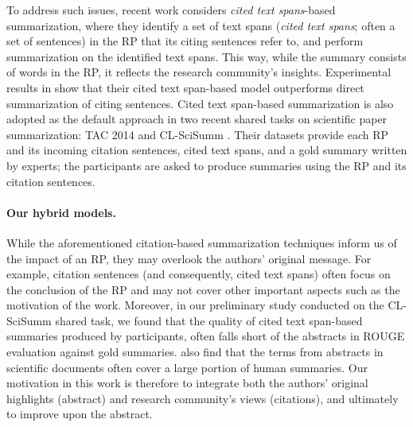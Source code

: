 \documentclass[letterpaper]{article} \usepackage{aaai19}  \usepackage{times}  \usepackage{helvet}  \usepackage{courier}  \usepackage{url}
\begin{document}
To address such issues, recent work
\cite{mei-zhai:2008:ACLMain,cohan2015sci,jaidka2016overview,li2017computational,Cohan:2017:CCS:3077136.3080740,cohan2017scientific}
considers {\it cited text spans}-based summarization, where
they identify a {set} of text spans ({\it cited text spans}; often a set of sentences) in the RP that
its citing sentences refer to, and
perform summarization on
the identified text spans.
This way, while the summary consists of words in the RP, it reflects the research community's insights.
Experimental results in \citeauthor{mei-zhai:2008:ACLMain} show that their cited text span-based model outperforms direct summarization of citing sentences.
Cited text span-based summarization is also adopted as the default approach in
two recent shared tasks on scientific paper summarization: TAC 2014
and CL-SciSumm
\cite{jaidka2016overview}.
Their datasets provide each RP and its incoming citation sentences, cited text spans, and a gold summary written by experts; the participants are asked to produce summaries using the RP and its citation sentences.



\paragraph{Our hybrid models.}

While the aforementioned citation-based summarization techniques inform us of the impact of an RP, they may overlook the authors' original message.
For example, citation sentences (and consequently, cited text spans) often focus on the conclusion of the RP and may not cover other important aspects such as the motivation of the work.
Moreover, in our preliminary study conducted on the CL-SciSumm shared task, we found that the quality of cited text span-based
summaries produced by participants, often falls short of the abstracts in ROUGE evaluation against gold summaries.
\citet{conroy2017section} also find that the terms from abstracts in scientific documents often
cover a large portion of human summaries.
Our motivation in this work is therefore to integrate both the authors' original highlights (abstract)  and research community's views (citations),
and ultimately to improve upon the abstract.
\end{document}
